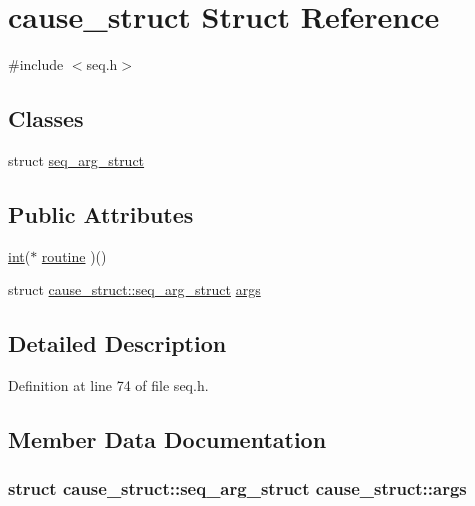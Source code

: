 \hypertarget{structcause__struct}{}\section{cause\+\_\+struct Struct Reference}
\label{structcause__struct}


{\ttfamily \#include $<$seq.\+h$>$}

\subsection*{Classes}
\begin{DoxyCompactItemize}
\item 
struct \hyperlink{structcause__struct_1_1seq__arg__struct}{seq\+\_\+arg\+\_\+struct}
\end{DoxyCompactItemize}
\subsection*{Public Attributes}
\begin{DoxyCompactItemize}
\item 
\hyperlink{xmltok_8h_a5a0d4a5641ce434f1d23533f2b2e6653}{int}($\ast$ \hyperlink{structcause__struct_a32140552b697d652a19f4074bf94d23e}{routine} )()
\item 
struct \hyperlink{structcause__struct_1_1seq__arg__struct}{cause\+\_\+struct\+::seq\+\_\+arg\+\_\+struct} \hyperlink{structcause__struct_a3a10017a6d168d4d4ec4fb21344136f8}{args}
\end{DoxyCompactItemize}


\subsection{Detailed Description}


Definition at line 74 of file seq.\+h.



\subsection{Member Data Documentation}
\subsubsection[{\texorpdfstring{args}{args}}]{\setlength{\rightskip}{0pt plus 5cm}struct {\bf cause\+\_\+struct\+::seq\+\_\+arg\+\_\+struct}  cause\+\_\+struct\+::args}\hypertarget{structcause__struct_a3a10017a6d168d4d4ec4fb21344136f8}{}\label{structcause__struct_a3a10017a6d168d4d4ec4fb21344136f8}

